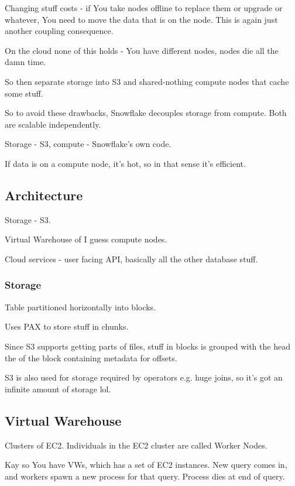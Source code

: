 \documentclass{article}
\begin{document}
		Changing stuff costs - if You take nodes offline to replace them or upgrade or whatever, You need to move the data that is on the node. This is again just another coupling consequence.
		
		On the cloud none of this holds - You have different nodes, nodes die all the damn time.
		
		So then separate storage into S3 and shared-nothing compute nodes that cache some stuff.
		
		So to avoid these drawbacks, Snowflake decouples storage from compute. Both are scalable independently.
		
		Storage - S3, compute - Snowflake's own code.
		
		If data is on a compute node, it's hot, so in that sense it's efficient.
		
	\subsection{Architecture}
	
		Storage - S3.
		
		Virtual Warehouse of I guess compute nodes.
		
		Cloud services - user facing API, basically all the other database stuff.
		
		\subsubsection{Storage}
		
			Table partitioned horizontally into blocks.
			
			Uses PAX to store stuff in chunks.
			
			Since S3 supports getting parts of files, stuff in blocks is grouped with the head the of the block containing metadata for offsets.
			
			S3 is also used for storage required by operators e.g. huge joins, so it's got an infinite amount of storage lol.
			
	\subsection{Virtual Warehouse}
	
		Clusters of EC2. Individuals in the EC2 cluster are called Worker Nodes.
		
		Kay so You have VWs, which has a set of EC2 instances. New query comes in, and workers spawn a new process for that query. Process dies at end of query.
		
\end{document}

